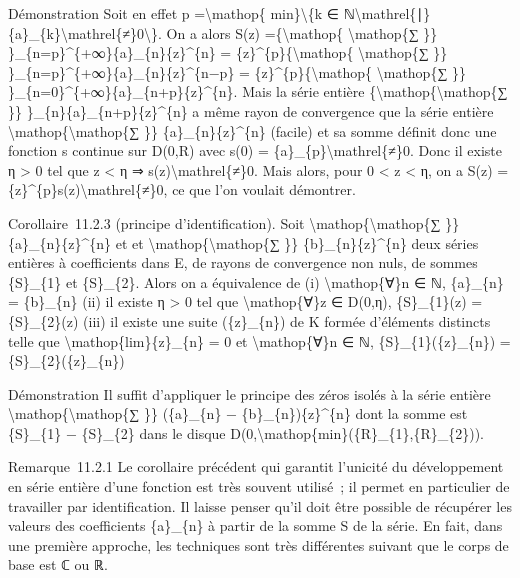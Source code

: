 \documentclass[]{article}
\begin{document}
Démonstration Soit en effet p =\textbackslash{}mathop\{
min\}\textbackslash{}\{k ∈
ℕ\textbackslash{}mathrel\{∣\}\{a\}\_\{k\}\textbackslash{}mathrel\{≠\}0\textbackslash{}\}.
On a alors S(z) =\{\textbackslash{}mathop\{ \textbackslash{}mathop\{∑
\}\} \}\_\{n=p\}\^{}\{+∞\}\{a\}\_\{n\}\{z\}\^{}\{n\} =
\{z\}\^{}\{p\}\{\textbackslash{}mathop\{ \textbackslash{}mathop\{∑ \}\}
\}\_\{n=p\}\^{}\{+∞\}\{a\}\_\{n\}\{z\}\^{}\{n−p\} =
\{z\}\^{}\{p\}\{\textbackslash{}mathop\{ \textbackslash{}mathop\{∑ \}\}
\}\_\{n=0\}\^{}\{+∞\}\{a\}\_\{n+p\}\{z\}\^{}\{n\}. Mais la série entière
\{\textbackslash{}mathop\{\textbackslash{}mathop\{∑ \}\}
\}\_\{n\}\{a\}\_\{n+p\}\{z\}\^{}\{n\} a même rayon de convergence que la
série entière \textbackslash{}mathop\{\textbackslash{}mathop\{∑ \}\}
\{a\}\_\{n\}\{z\}\^{}\{n\} (facile) et sa somme définit donc une
fonction s continue sur D(0,R) avec s(0) =
\{a\}\_\{p\}\textbackslash{}mathrel\{≠\}0. Donc il existe η
\textgreater{} 0 tel que \textbar{}z\textbar{} \textless{} η ⇒
s(z)\textbackslash{}mathrel\{≠\}0. Mais alors, pour 0 \textless{}
\textbar{}z\textbar{} \textless{} η, on a S(z) =
\{z\}\^{}\{p\}s(z)\textbackslash{}mathrel\{≠\}0, ce que l'on voulait
démontrer.

Corollaire~11.2.3 (principe d'identification). Soit
\textbackslash{}mathop\{\textbackslash{}mathop\{∑ \}\}
\{a\}\_\{n\}\{z\}\^{}\{n\} et et
\textbackslash{}mathop\{\textbackslash{}mathop\{∑ \}\}
\{b\}\_\{n\}\{z\}\^{}\{n\} deux séries entières à coefficients dans E,
de rayons de convergence non nuls, de sommes \{S\}\_\{1\} et
\{S\}\_\{2\}. Alors on a équivalence de (i) \textbackslash{}mathop\{∀\}n
∈ ℕ, \{a\}\_\{n\} = \{b\}\_\{n\} (ii) il existe η \textgreater{} 0 tel
que \textbackslash{}mathop\{∀\}z ∈ D(0,η), \{S\}\_\{1\}(z) =
\{S\}\_\{2\}(z) (iii) il existe une suite (\{z\}\_\{n\}) de K formée
d'éléments distincts telle que \textbackslash{}mathop\{lim\}\{z\}\_\{n\}
= 0 et \textbackslash{}mathop\{∀\}n ∈ ℕ, \{S\}\_\{1\}(\{z\}\_\{n\}) =
\{S\}\_\{2\}(\{z\}\_\{n\})

Démonstration Il suffit d'appliquer le principe des zéros isolés à la
série entière \textbackslash{}mathop\{\textbackslash{}mathop\{∑ \}\}
(\{a\}\_\{n\} − \{b\}\_\{n\})\{z\}\^{}\{n\} dont la somme est
\{S\}\_\{1\} − \{S\}\_\{2\} dans le disque
D(0,\textbackslash{}mathop\{min\}(\{R\}\_\{1\},\{R\}\_\{2\})).

Remarque~11.2.1 Le corollaire précédent qui garantit l'unicité du
développement en série entière d'une fonction est très souvent utilisé~;
il permet en particulier de travailler par identification. Il laisse
penser qu'il doit être possible de récupérer les valeurs des
coefficients \{a\}\_\{n\} à partir de la somme S de la série. En fait,
dans une première approche, les techniques sont très différentes suivant
que le corps de base est ℂ ou ℝ.
\end{document}
